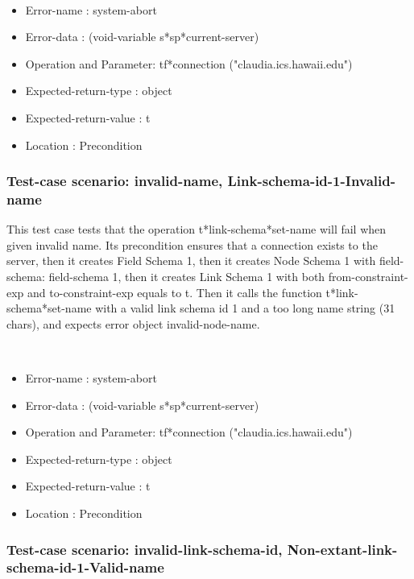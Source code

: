 \
\begin {itemize}
\item 	Error-name             : system-abort
\item Error-data             : (void-variable s*sp*current-server)
\item Operation and Parameter: tf*connection ("claudia.ics.hawaii.edu")
\item Expected-return-type   : object
\item Expected-return-value  : t
\item Location               : Precondition



\end {itemize}
\subsubsection {Test-case scenario: invalid-name, Link-schema-id-1-Invalid-name}


This test case tests that the operation t*link-schema*set-name will fail when given invalid name.
Its precondition ensures that a connection exists to the server, then it creates Field Schema 1, then it creates Node Schema 1 with field-schema: field-schema 1, then it creates Link Schema 1 with both from-constraint-exp and to-constraint-exp equals to t.
Then it calls the function t*link-schema*set-name  with a valid link schema id 1 and a too long name string (31 chars), and expects error object invalid-node-name.



\
\begin {itemize}
\item 	Error-name             : system-abort
\item Error-data             : (void-variable s*sp*current-server)
\item Operation and Parameter: tf*connection ("claudia.ics.hawaii.edu")
\item Expected-return-type   : object
\item Expected-return-value  : t
\item Location               : Precondition



\end {itemize}
\subsubsection {Test-case scenario: invalid-link-schema-id, Non-extant-link-schema-id-1-Valid-name}


